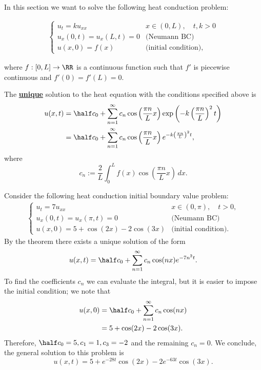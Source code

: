 \documentclass[12pt, a4paper]{article}
\begin{document}
In this section we want to solve the following heat conduction problem:

\[\begin{aligned}
    \begin{cases}
        u_t=ku_{xx} & x \in (0,L), \quad t,k>0 \\
        u_x(0,t)=u_x(L,t)=0 & \text{(Neumann BC)} \\
        u(x,0)=f(x) & \text{(initial condition)},
    \end{cases}
\end{aligned}\]

where \(f:[0,L] \to \RR\) is a continuous function such that \(f'\) is piecewise continuous and \(f'(0)=f'(L)=0\).

\begin{mdthm}
    The \underline{\textbf{unique}} solution to the heat equation with the conditions specified above is 
    \[\begin{aligned}
        u(x,t)&= \half c_0 + \sum_{n=1}^{\infty} c_n \cos \left( \frac{\pi n}{L} x \right) \exp\left( -k \left( \frac{\pi n}{L} \right)^2 t \right) \\
        &= \half c_0 + \sum_{n=1}^{\infty} c_n \cos \left( \frac{\pi n}{L} x \right) e^{ -k \left( \frac{\pi n}{L} \right)^2 t},
    \end{aligned}\]
    where 
    \[c_n := \frac{2}{L} \int_{0}^L f(x) \cos \left( \frac{\pi n}{L}x \right) \, dx.\]
\end{mdthm}

\begin{mdexample}
    Consider the following heat conduction initial boundary value problem:
    \[\begin{aligned}
        \begin{cases}
            u_t = 7u_{xx} & x\in (0,\pi), \quad t>0, \\
            u_x(0,t)=u_x(\pi,t)=0 &\text{(Neumann BC)} \\
            u(x,0)=5+\cos(2x)-2\cos(3x) &\text{(initial condition)}.
        \end{cases}
    \end{aligned}\]
    By the theorem there exists a unique solution of the form 
    \[u(x,t) = \half c_0+  \sum_{n=1}^{\infty} c_n \cos(nx) e^{ -7n^2 t}.\]
    To find the coefficients \(c_n\) we can evaluate the integral, but it is easier to impose the initial condition; we note that 
    \[\begin{aligned}
        u(x,0) &= \half c_0+  \sum_{n=1}^{\infty} c_n \cos(nx) \\
        &= 5+\cos(2x)-2\cos(3x).
    \end{aligned}\]
    Therefore, \(\half c_0 =5 ,c_1=1,c_3=-2\) and the remaining \(c_n=0\). We conclude, the general solution to this problem is 
    \[u(x,t)=5+e^{-28 t}\cos(2x)-2e^{-63 t}\cos(3x).\]
\end{mdexample}
\end{document}

